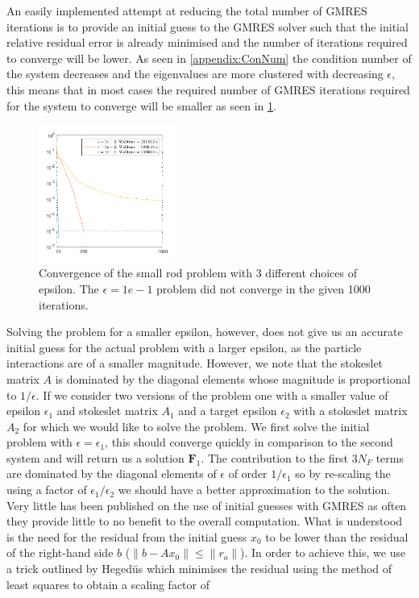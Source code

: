 An easily implemented attempt at reducing the total number of GMRES iterations is to provide an initial guess to the GMRES solver such that the initial relative residual error is already minimised and the number of iterations required to converge will be lower. As seen in \cref{appendix:ConNum} the condition number of the system decreases and the eigenvalues are more clustered with decreasing $\epsilon$, this means that in most cases the required number of GMRES iterations required for the system to converge will be smaller as seen in \cref{fig:InitalGuessEPS}.
\begin{figure}[ht]
    \centering
    \includegraphics[width=0.4\textwidth]{Images/InitalGuessEPS.pdf}
    \caption{Convergence of the small rod problem with 3 different choices of epsilon. The $\epsilon = 1e-1$ problem did not converge in the given 1000 iterations.}
    \label{fig:InitalGuessEPS}
\end{figure}
Solving the problem for a smaller epsilon, however, does not give us an accurate initial guess for the actual problem with a larger epsilon, as the particle interactions are of a smaller magnitude. However, we note that the stokeslet matrix $A$ is dominated by the diagonal elements whose magnitude is proportional to $1/\epsilon$. If we consider two versions of the problem one with a smaller value of epsilon $\epsilon_1$ and stokeslet matrix $A_1$ and a target epsilon $\epsilon_2$ with a stokeslet matrix $A_2$ for which we would like to solve the problem. We first solve the initial problem with $\epsilon=\epsilon_1$, this should converge quickly in comparison to the second system and will return us a solution $\bm{F}_1$. The contribution to the first $3N_{F}$ terms are dominated by the diagonal elements of $\epsilon$ of order $1/\epsilon_1$ so by re-scaling the using a factor of $\epsilon_1/\epsilon_2$ we should have a better approximation to the solution. Very little has been published on the use of initial guesses with GMRES as often they provide little to no benefit to the overall computation. What is understood is the need for the residual from the initial guess $x_0$ to be lower than the residual of the right-hand side $b$ ($\lVert b-Ax_0 \rVert \leq \lVert r_o \rVert$). In order to achieve this, we use a trick outlined by Heged{\"u}s \cite{Saad1986GMRES:Systems,Strakos2005OnComputations} which minimises the residual using the method of least squares to obtain a scaling factor of 
